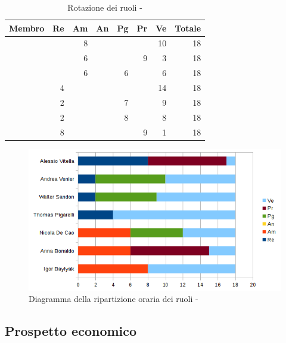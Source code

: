 \documentclass[12pt,a4paper]{article}
\begin{document}
\begin{table}[H]
	\begin{center}
		\begin{tabular}{l r r r r r r r}
			\toprule
			\textbf{Membro}	&	\textbf{Re}	&	\textbf{Am}	& \textbf{An} & \textbf{Pg} & \textbf{Pr} & \textbf{Ve} & \textbf{Totale}\\
			\midrule
			\midrule
			\IB & & 8 & & & & 10 & 18 \\
			\midrule
			\AB & & 6 & & & 9 & 3 & 18 \\
			\midrule
			\NDC & & 6 & & 6 & & 6 & 18 \\
			\midrule
			\TP & 4 & & & & &14 & 18 \\
			\midrule
			\WS & 2 & & & 7 & & 9 & 18 \\
			\midrule
			\AVE & 2 & & & 8 & & 8 & 18 \\
			\midrule
			\AVI & 8 & & & & 9 & 1 & 18 \\
			\bottomrule
		\end{tabular}
		\caption{Rotazione dei ruoli - \FVV}
	\end{center}
\end{table}

\begin{center}
	\begin{figure}[H]
		\centering
		\includegraphics[width=\textwidth]{diagrammaBarreVerificaValidazioneRotazioneRuoli.png}
		\caption{Diagramma della ripartizione oraria dei ruoli - \FVV}
	\end{figure}
\end{center}

\subsection{Prospetto economico}
\end{document}
